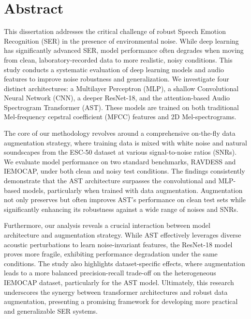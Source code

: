 
\chapter*{Abstract}

This dissertation addresses the critical challenge of robust Speech Emotion Recognition (SER) in the presence of environmental noise. While deep learning has significantly advanced SER, model performance often degrades when moving from clean, laboratory-recorded data to more realistic, noisy conditions. This study conducts a systematic evaluation of deep learning models and audio features to improve noise robustness and generalization. We investigate four distinct architectures: a Multilayer Perceptron (MLP), a shallow Convolutional Neural Network (CNN), a deeper ResNet-18, and the attention-based Audio Spectrogram Transformer (AST). These models are trained on both traditional Mel-frequency cepstral coefficient (MFCC) features and 2D Mel-spectrograms.

The core of our methodology revolves around a comprehensive on-the-fly data augmentation strategy, where training data is mixed with white noise and natural soundscapes from the ESC-50 dataset at various signal-to-noise ratios (SNRs). We evaluate model performance on two standard benchmarks, RAVDESS and IEMOCAP, under both clean and noisy test conditions. The findings consistently demonstrate that the AST architecture surpasses the convolutional and MLP-based models, particularly when trained with data augmentation. Augmentation not only preserves but often improves AST's performance on clean test sets while significantly enhancing its robustness against a wide range of noises and SNRs.

Furthermore, our analysis reveals a crucial interaction between model architecture and augmentation strategy. While AST effectively leverages diverse acoustic perturbations to learn noise-invariant features, the ResNet-18 model proves more fragile, exhibiting performance degradation under the same conditions. The study also highlights dataset-specific effects, where augmentation leads to a more balanced precision-recall trade-off on the heterogeneous IEMOCAP dataset, particularly for the AST model. Ultimately, this research underscores the synergy between transformer architectures and robust data augmentation, presenting a promising framework for developing more practical and generalizable SER systems.